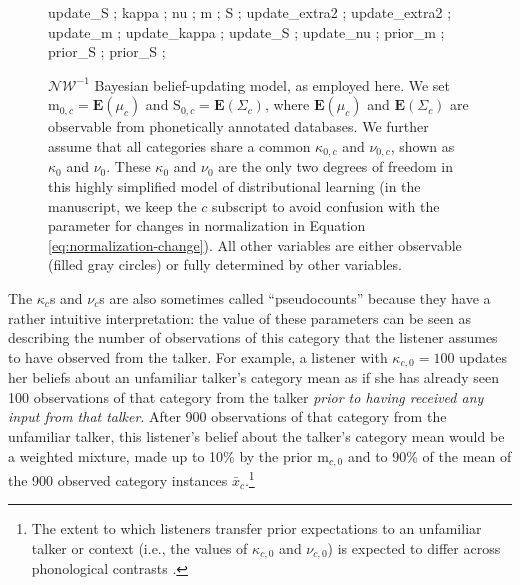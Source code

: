 \documentclass[
  11pt,
  man,floatsintext]{apa6}
\begin{document}
\begin{figure}
{     {update_S} ; %
     {kappa} ; %
     {nu} ; %
     {m} ; %
     {S} ; %
     {update_extra2} ; %
     {update_extra2} ; %
     {update_m} ; %
     {update_kappa} ; %
     {update_S} ; %
     {update_nu} ; %
     {prior_m} ;
     {prior_S} ;
     {prior_S} ;
  }
  \caption{$\mathcal{NW}^{-1}$ Bayesian belief-updating model, as employed here. We set $\mathrm{m}_{0,c} = \mathbf{E}(\mu_c)$ and $\mathrm{S}_{0,c}=\mathbf{E}(\Sigma_c)$, where $\mathbf{E}(\mu_c)$ and $\mathbf{E}(\Sigma_c)$ are observable from phonetically annotated databases. We further assume that all categories share a common $\kappa_{0,c}$ and $\nu_{0,c}$, shown as $\kappa_{0}$ and $\nu_{0}$. These $\kappa_{0}$ and $\nu_{0}$ are the only two degrees of freedom in this highly simplified model of distributional learning (in the manuscript, we keep the $c$ subscript to avoid confusion with the parameter for changes in normalization in Equation \ref{eq:normalization-change}). All other variables are either observable (filled gray circles) or fully determined by other variables.}\label{fig:model-belief-updating}
\end{figure}

The \(\kappa_{c}\)s and \(\nu_{c}\)s are also sometimes called ``pseudocounts'' because they have a rather intuitive interpretation: the value of these parameters can be seen as describing the number of observations of this category that the listener assumes to have observed from the talker. For example, a listener with \(\kappa_{c,0} = 100\) updates her beliefs about an unfamiliar talker's category mean as if she has already seen 100 observations of that category from the talker \emph{prior to having received any input from that talker}. After 900 observations of that category from the unfamiliar talker, this listener's belief about the talker's category mean would be a weighted mixture, made up to 10\% by the prior \(\mathrm{m}_{c,0}\) and to 90\% of the mean of the 900 observed category instances \(\bar{x}_c\).\footnote{The extent to which listeners transfer prior expectations to an unfamiliar talker or context (i.e., the values of \(\kappa_{c,0}\) and \(\nu_{c,0}\)) is expected to differ across phonological contrasts \autocite[see discussion in][]{kleinschmidt-jaeger2015}.}
\end{document}
